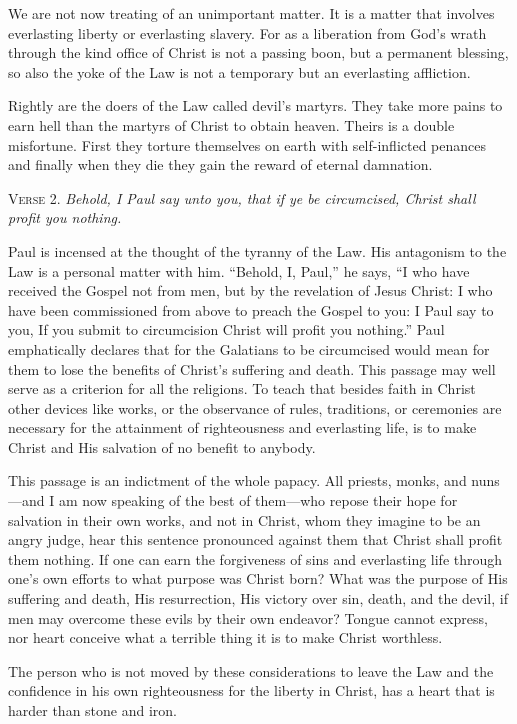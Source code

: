 We are not now treating of an unimportant matter. It is a matter that involves everlasting liberty or everlasting slavery. For as a liberation from God’s wrath through the kind office of Christ is not a passing boon, but a permanent blessing, so also the yoke of the Law is not a temporary but an everlasting affliction.

Rightly are the doers of the Law called devil’s martyrs. They take more pains to earn hell than the martyrs of Christ to obtain heaven. Theirs is a double misfortune. First they torture themselves on earth with self-inflicted penances and finally when they die they gain the reward of eternal damnation.

\textsc{Verse} 2. \emph{Behold, I Paul say unto you, that if ye be circumcised, Christ shall profit you nothing.}

Paul is incensed at the thought of the tyranny of the Law. His antagonism to the Law is a personal matter with him. “Behold, I, Paul,” he says, “I who have received the Gospel not from men, but by the revelation of Jesus Christ: I who have been commissioned from above to preach the Gospel to you: I Paul say to you, If you submit to circumcision Christ will profit you nothing.” Paul emphatically declares that for the Galatians to be circumcised would mean for them to lose the benefits of Christ’s suffering and death. This passage may well serve as a criterion for all the religions. To teach that besides faith in Christ other devices like works, or the observance of rules, traditions, or ceremonies are necessary for the attainment of righteousness and everlasting life, is to make Christ and His salvation of no benefit to anybody.

This passage is an indictment of the whole papacy. All priests, monks, and nuns—and I am now speaking of the best of them—who repose their hope for salvation in their own works, and not in Christ, whom they imagine to be an angry judge, hear this sentence pronounced against them that Christ shall profit them nothing. If one can earn the forgiveness of sins and everlasting life through one’s own efforts to what purpose was Christ born? What was the purpose of His suffering and death, His resurrection, His victory over sin, death, and the devil, if men may overcome these evils by their own endeavor? Tongue cannot express, nor heart conceive what a terrible thing it is to make Christ worthless.

The person who is not moved by these considerations to leave the Law and the confidence in his own righteousness for the liberty in Christ, has a heart that is harder than stone and iron.

